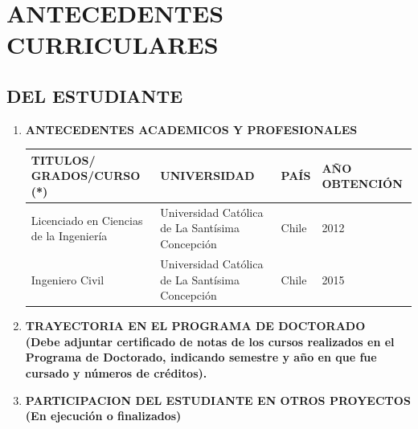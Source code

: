 \documentclass[11pt,letterpaper]{article}
\begin{document}
\begin{tcolorbox}[breakable]

\lipsum[44]

\blindenumerate[3]

\lipsum[45]

\end{tcolorbox}


\newpage 

\section{ANTECEDENTES CURRICULARES}
\subsection{DEL ESTUDIANTE}

\begin{enumerate}
\item  \textbf{ANTECEDENTES ACADEMICOS Y PROFESIONALES} \\
\begin{table}[h]
\sffamily\footnotesize
\tabulinesep=6pt
\arrayrulewidth=1pt
\begin{tabu}{| X[lm] | X[lm]| X[0.5cm,lm] | X[0.5cm,lm] |}
\hline
{}\color{white}\textbf{TITULOS/ GRADOS/CURSO (*)} & \color{white}\textbf{UNIVERSIDAD} &      \color{white}\textbf{PAÍS} & \color{white}\textbf{AÑO OBTENCIÓN} \\ \hline Licenciado en Ciencias de la Ingeniería & Universidad Católica de La Santísima Concepción & Chile & 2012 \\ \hline  Ingeniero Civil & Universidad Católica de La Santísima Concepción & Chile & 2015 \\ \hline
\end{tabu}
\end{table}

\item \textbf{TRAYECTORIA EN EL PROGRAMA DE DOCTORADO} \\
\textbf{(Debe adjuntar certificado de notas de los cursos realizados en el Programa de Doctorado, indicando semestre y año en que fue cursado y números de créditos).}
\item \textbf{PARTICIPACION DEL ESTUDIANTE EN OTROS PROYECTOS (En ejecución o finalizados) }\\ 
\begin{table}[h]
\sffamily\footnotesize
\tabulinesep=6pt
\arrayrulewidth=1pt
\begin{tabu}{| X[0.2cm,lm] | X[0.2cm,lm] | X[lm]| X[0.5cm,lm] | X[0.5cm,lm] |}
\hline
 

\end{tabu}
\end{table}
\end{enumerate}
\end{document}
